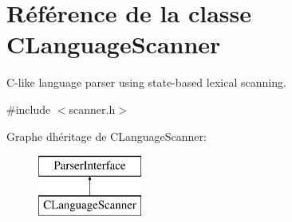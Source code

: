 \hypertarget{class_c_language_scanner}{}\section{Référence de la classe C\+Language\+Scanner}
\label{class_c_language_scanner}


C-\/like language parser using state-\/based lexical scanning.  




{\ttfamily \#include $<$scanner.\+h$>$}

Graphe d\textquotesingle{}héritage de C\+Language\+Scanner\+:\begin{figure}[H]
\begin{center}
\leavevmode
\includegraphics[height=2.000000cm]{class_c_language_scanner}
\end{center}
\end{figure}
